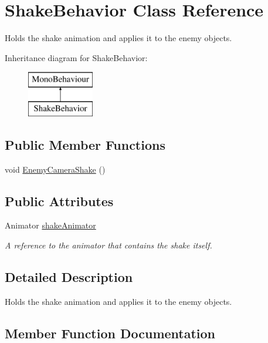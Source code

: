 \hypertarget{class_shake_behavior}{}\section{Shake\+Behavior Class Reference}
\label{class_shake_behavior}


Holds the shake animation and applies it to the enemy objects.  


Inheritance diagram for Shake\+Behavior\+:\begin{figure}[H]
\begin{center}
\leavevmode
\includegraphics[height=2.000000cm]{class_shake_behavior}
\end{center}
\end{figure}
\subsection*{Public Member Functions}
\begin{DoxyCompactItemize}
\item 
void \mbox{\hyperlink{class_shake_behavior_aa7d0f4a5ab0a8f566ce5203fe9f4b229}{Enemy\+Camera\+Shake}} ()
\end{DoxyCompactItemize}
\subsection*{Public Attributes}
\begin{DoxyCompactItemize}
\item 
Animator \mbox{\hyperlink{class_shake_behavior_aae508c1977572a978bd931512057da10}{shake\+Animator}}
\begin{DoxyCompactList}\small\item\em A reference to the animator that contains the shake itself. \end{DoxyCompactList}\end{DoxyCompactItemize}


\subsection{Detailed Description}
Holds the shake animation and applies it to the enemy objects. 

\subsection{Member Function Documentation}
\mbox{\label{class_shake_behavior_aa7d0f4a5ab0a8f566ce5203fe9f4b229}} 
